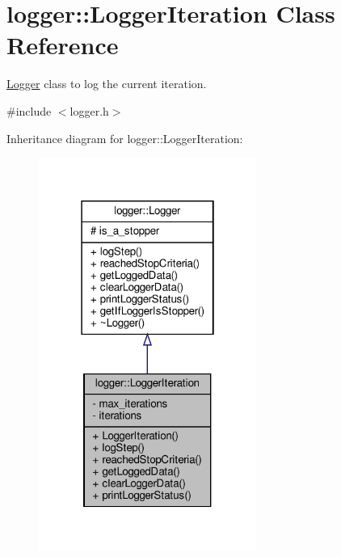 \hypertarget{classlogger_1_1_logger_iteration}{}\section{logger\+:\+:Logger\+Iteration Class Reference}
\label{classlogger_1_1_logger_iteration}


\hyperlink{classlogger_1_1_logger}{Logger} class to log the current iteration.  




{\ttfamily \#include $<$logger.\+h$>$}



Inheritance diagram for logger\+:\+:Logger\+Iteration\+:
\nopagebreak
\begin{figure}[H]
\begin{center}
\leavevmode
\includegraphics[width=202pt]{classlogger_1_1_logger_iteration__inherit__graph}
\end{center}
\end{figure}


